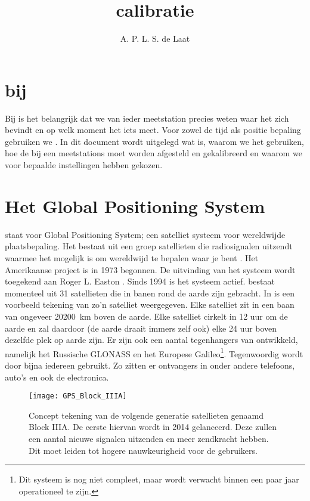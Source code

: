 



\title{\gps calibratie}
\author{A. P. L. S. de Laat}
\date{}

\maketitle

\section{\gps bij \hisparc}\label{sec:gps_hisparc}

Bij \hisparc is het belangrijk dat we van ieder meetstation precies weten waar
het zich bevindt en op welk moment het iets meet. Voor zowel de
tijd als positie bepaling gebruiken we \gps. In dit document wordt
uitgelegd wat \gps is, waarom we het gebruiken, hoe de \gps bij een
\hisparc meetstations moet worden afgesteld en gekalibreerd en waarom we
voor bepaalde instellingen hebben gekozen.


\section{Het Global Positioning System}\label{sec:gps}

\gps staat voor Global Positioning System; een satelliet systeem voor
wereldwijde plaatsbepaling. Het bestaat uit een groep satellieten die
radiosignalen uitzendt waarmee het mogelijk is om wereldwijd te bepalen
waar je bent \cite{gps2013gov}. Het Amerikaanse project is in 1973
begonnen. De uitvinding van het systeem wordt toegekend aan Roger L.
Easton \cite{easton2006who}. Sinds 1994 is het systeem actief. \gps
bestaat momenteel uit 31 satellieten die in banen rond de aarde zijn
gebracht. In  is een voorbeeld tekening van
zo'n \gps satelliet weergegeven. Elke \gps satelliet zit in een baan van
ongeveer \SI{20200}{\kilo\meter} boven de aarde. Elke satelliet cirkelt
in 12 uur om de aarde en zal daardoor (de aarde draait immers zelf ook)
elke 24 uur boven dezelfde plek op aarde zijn. Er zijn ook een aantal
tegenhangers van \gps ontwikkeld, namelijk het Russische GLONASS en het
Europese Galileo\footnote{Dit systeem is nog niet compleet, maar wordt
verwacht binnen een paar jaar operationeel te zijn.}. Tegenwoordig wordt
\gps door bijna iedereen gebruikt. Zo zitten er \gps ontvangers in onder
andere telefoons, auto's en ook de \hisparc electronica.

\begin{figure}
    \centering
    \texttt{[image: GPS\_Block\_IIIA]}
    \caption{Concept tekening van de volgende generatie \gps satellieten
    genaamd \gps Block IIIA. De eerste hiervan wordt in 2014 gelanceerd.
    Deze zullen een aantal nieuwe signalen uitzenden en meer zendkracht
    hebben. Dit moet leiden tot hogere nauwkeurigheid voor de gebruikers.}
    \label{fig:GPSBlockIIIA}
\end{figure}

